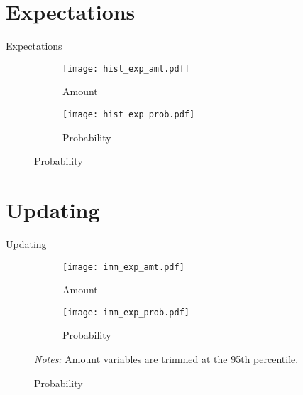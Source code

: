 \documentclass[8pt]{beamer}
\begin{document}
\section{Expectations}

\begin{frame}{Expectations}
    

\begin{figure}[H]
    \caption{Histograms of expectations}
    \label{hist_exp}
    \begin{center}
        \begin{subfigure}{0.45\textwidth}
            \caption{Amount}
            \centering
            \texttt{[image: hist\_exp\_amt.pdf]}
        \end{subfigure}
        \begin{subfigure}{0.45\textwidth}
            \caption{Probability}
                \centering
                \texttt{[image: hist\_exp\_prob.pdf]}
        \end{subfigure}
        \end{center}
        \end{figure}
\end{frame}


\section{Updating}

\begin{frame}{Updating}
    \begin{figure}[H]
    \caption{Immediate updating}
    \label{update_expimm}
    \begin{center}
        \begin{subfigure}{0.45\textwidth}
            \caption{Amount}
            \centering
            \texttt{[image: imm\_exp\_amt.pdf]}
        \end{subfigure}
        \begin{subfigure}{0.45\textwidth}
            \caption{Probability}
                \centering
                \texttt{[image: imm\_exp\_prob.pdf]}
        \end{subfigure}
    \end{center} 
         \scriptsize \textit{Notes:} Amount variables are trimmed at the 95th percentile.
\end{figure}
\end{frame}
\end{document}
